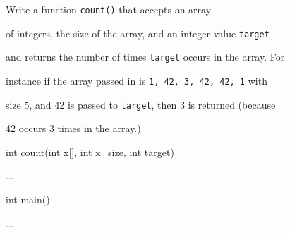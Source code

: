 Write a function \texttt{count()} that accepts an array

of integers, the size of the array, and an integer value \texttt{target}

and returns the number of times \texttt{target} occurs in the array. For

instance if the array passed in is \texttt{{1, 42, 3, 42, 42, 1}} with

size 5, and 42 is passed to \texttt{target}, then 3 is returned (because

42 occurs 3 times in the array.)



\begin{consolethree}[escapeinside=||]

int count(int x[], int x\_size, int target)

{

    ...

}



int main()

{

    ...

}

\end{consolethree}

